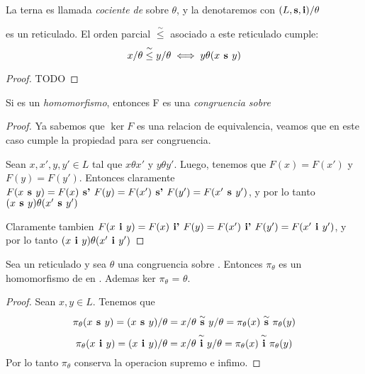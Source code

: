 \begin{definition}
  La terna  es llamada \emph{cociente de} \reticulAlg sobre $\theta$,
  y la denotaremos con $(L, \textbf{s}, \textbf{i})/\theta$
\end{definition}

\begin{lemma}
   es un reticulado. El orden
  parcial $\overset{\sim}{\leq}$ asociado a este reticulado cumple:
  $$
  x/\theta \overset{\sim}{\leq} y/\theta \iff y\theta(x\textbf{ s }y)
  $$
\end{lemma}

\begin{proof}
  TODO
\end{proof}

\begin{lemma}
  Si  es un \emph{homomorfismo}, entonces F es una \emph{congruencia sobre} \reticulAlg
\end{lemma}
\begin{proof}
  Ya sabemos que $\ker F$ es una relacion de equivalencia, veamos que en este caso cumple la propiedad para ser congruencia.

  Sean $x, x', y, y' \in L$ tal que $x\theta x'$ y $y\theta y'$. Luego, tenemos que $F(x) = F(x')$ y $F(y) = F(y')$.
  Entonces claramente $F(x\textbf{ s }y) = F(x) \textbf{ s' } F(y) = F(x') \textbf{ s' } F(y') = F(x'\textbf{ s }y')$, y por lo tanto 
  $(x\textbf{ s }y)\theta(x'\textbf{ s }y')$
  
  Claramente tambien $F(x\textbf{ i }y) = F(x) \textbf{ i' } F(y) = F(x') \textbf{ i' } F(y') = F(x'\textbf{ i }y')$, y por lo tanto $(x\textbf{ i }y)\theta(x'\textbf{ i }y')$
\end{proof}

\begin{lemma}
  Sea \reticulAlg un reticulado y sea $\theta$ una congruencia sobre \reticulAlg. Entonces $\pi_\theta$ es un 
  homomorfismo de \reticulAlg en .
  Ademas ker $\pi_\theta$ = $\theta$.
\end{lemma}
\begin{proof}
  Sean $x, y \in L$. Tenemos que
  $$
  \pi_\theta(x\textbf{ s }y) = (x\textbf{ s }y)/\theta = x/\theta \overset{\sim}{\textbf{ s }} y/\theta = \pi_\theta(x) \overset{\sim}{\textbf{ s }} \pi_\theta(y)
  $$
  $$
  \pi_\theta(x\textbf{ i }y) = (x\textbf{ i }y)/\theta = x/\theta \overset{\sim}{\textbf{ i }} y/\theta = \pi_\theta(x) \overset{\sim}{\textbf{ i }} \pi_\theta(y)
  $$
  Por lo tanto $\pi_\theta$ conserva la operacion supremo e infimo.

\end{proof}

